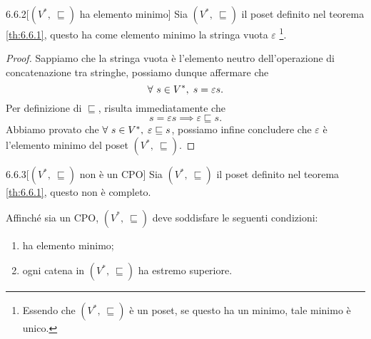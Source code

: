 \begin{customthm}{6.6.2}[$(V^*,\ \sqsubseteq )$ ha elemento minimo]
\label{th:6.6.2}
Sia $(V^*,\ \sqsubseteq )$ il poset definito nel teorema \ref{th:6.6.1}, questo ha come elemento minimo la stringa vuota $\varepsilon$ \footnote{Essendo che $(V^*,\ \sqsubseteq )$ è un poset, se questo ha un minimo, tale minimo è unico.}.
\end{customthm}

\begin{proof}
Sappiamo che la stringa vuota è l'elemento neutro dell'operazione di concatenazione tra stringhe, possiamo dunque affermare che \[
	\forall \ s \in V^* ,\; s = \varepsilon s.
\]
Per definizione di $\sqsubseteq$, risulta immediatamente che \[
	s = \varepsilon s \implies \varepsilon \sqsubseteq s.
\]
Abbiamo provato che $\forall \ s \in V^* ,\; \varepsilon \sqsubseteq s$, possiamo infine concludere che $\varepsilon$ è l'elemento minimo del poset $(V^*,\ \sqsubseteq )$.
\end{proof}

\begin{customthm}{6.6.3}[$(V^*,\ \sqsubseteq )$ non è un CPO]
\label{th:6.6.3}
Sia $(V^*,\ \sqsubseteq )$ il poset definito nel teorema \ref{th:6.6.1}, questo non è completo.
\end{customthm}

Affinché sia un CPO, $(V^*,\ \sqsubseteq )$ deve soddisfare le seguenti condizioni:
\begin{enumerate}
\item ha elemento minimo;
\item ogni catena in $(V^*,\ \sqsubseteq )$ ha estremo superiore.
\end{enumerate}

